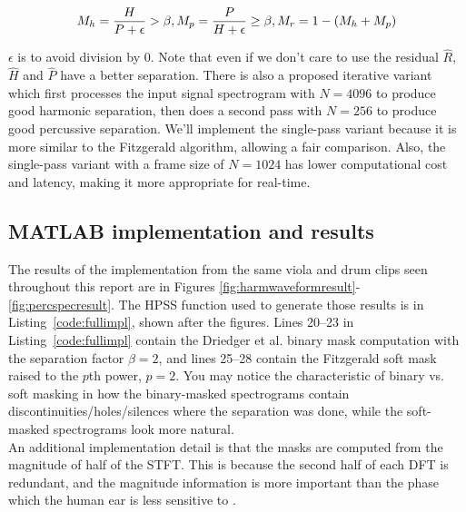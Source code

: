\documentclass[letter,12pt]{article}
\begin{document}
 \setlength{\abovedisplayskip}{0pt}%
 \setlength{\abovedisplayshortskip}{0pt}%
 \begin{align}
	 \vspace{-1em}
		M_{h} = \frac{H}{P + \epsilon} > \beta, M_{p} = \frac{P}{H + \epsilon} \ge \beta, M_{r} = 1 - (M_{h} + M_{p})
 \end{align}

$\epsilon$ is to avoid division by 0. Note that even if we don't care to use the residual $\hat{R}$, $\hat{H}$ and $\hat{P}$ have a better separation. There is also a proposed iterative variant which first processes the input signal spectrogram with $N = 4096$ to produce good harmonic separation, then does a second pass with $N = 256$ to produce good percussive separation. We'll implement the single-pass variant because it is more similar to the Fitzgerald algorithm, allowing a fair comparison. Also, the single-pass variant with a frame size of $N = 1024$ has lower computational cost and latency, making it more appropriate for real-time.

\subsection{MATLAB implementation and results}

The results of the implementation from the same viola and drum clips seen throughout this report are in Figures \ref{fig:harmwaveformresult}-\ref{fig:percspecresult}. The HPSS function used to generate those results is in Listing~\ref{code:fullimpl}, shown after the figures. Lines 20--23 in Listing~\ref{code:fullimpl} contain the Driedger et al. binary mask computation with the separation factor $\beta = 2$, and lines 25--28 contain the Fitzgerald soft mask raised to the $p$th power, $p = 2$. You may notice the characteristic of binary vs. soft masking in how the binary-masked spectrograms contain discontinuities/holes/silences where the separation was done, while the soft-masked spectrograms look more natural.\\

An additional implementation detail is that the masks are computed from the magnitude of half of the STFT. This is because the second half of each DFT is redundant, and the magnitude information is more important than the phase which the human ear is less sensitive to \cite{zafar}.
\end{document}
